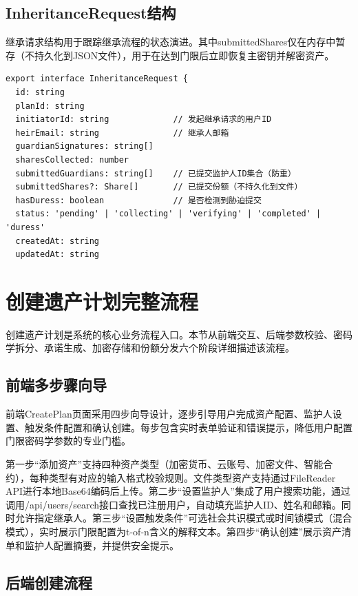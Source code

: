\documentclass[UTF8,a4paper,zihao=-4,openany]{ctexrep}
\begin{document}
\subsection{InheritanceRequest结构}

继承请求结构用于跟踪继承流程的状态演进。其中submittedShares仅在内存中暂存（不持久化到JSON文件），用于在达到门限后立即恢复主密钥并解密资产。

\begin{lstlisting}[caption={继承请求结构定义 (legacyPlanService.ts:63-76)}]
export interface InheritanceRequest {
  id: string
  planId: string
  initiatorId: string             // 发起继承请求的用户ID
  heirEmail: string               // 继承人邮箱
  guardianSignatures: string[]
  sharesCollected: number
  submittedGuardians: string[]    // 已提交监护人ID集合（防重）
  submittedShares?: Share[]       // 已提交份额（不持久化到文件）
  hasDuress: boolean              // 是否检测到胁迫提交
  status: 'pending' | 'collecting' | 'verifying' | 'completed' | 'duress'
  createdAt: string
  updatedAt: string
\end{lstlisting}

\section{创建遗产计划完整流程}

创建遗产计划是系统的核心业务流程入口。本节从前端交互、后端参数校验、密码学拆分、承诺生成、加密存储和份额分发六个阶段详细描述该流程。

\subsection{前端多步骤向导}

前端CreatePlan页面采用四步向导设计，逐步引导用户完成资产配置、监护人设置、触发条件配置和确认创建。每步包含实时表单验证和错误提示，降低用户配置门限密码学参数的专业门槛。

第一步“添加资产”支持四种资产类型（加密货币、云账号、加密文件、智能合约），每种类型有对应的输入格式校验规则。文件类型资产支持通过FileReader API进行本地Base64编码后上传。第二步“设置监护人”集成了用户搜索功能，通过调用/api/users/search接口查找已注册用户，自动填充监护人ID、姓名和邮箱。同时允许指定继承人。第三步“设置触发条件”可选社会共识模式或时间锁模式（混合模式），实时展示门限配置为t-of-n含义的解释文本。第四步“确认创建”展示资产清单和监护人配置摘要，并提供安全提示。

\subsection{后端创建流程}
\end{document}
